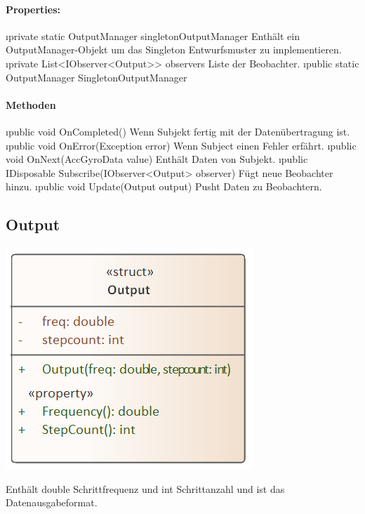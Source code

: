 \documentclass[../entwurf.tex]{subfiles}
\begin{document}
        \paragraph{Properties:}
        \begin{itemize}
            \i{private static OutputManager singletonOutputManager} Enthält ein OutputManager-Objekt um das Singleton Entwurfsmuster zu implementieren.
            \i{private List<IObserver<Output>> observers} Liste der Beobachter.
            \i{public static OutputManager SingletonOutputManager} 
        \end{itemize}
        \paragraph{Methoden}
        \begin{itemize}
            \i{public void OnCompleted()} Wenn Subjekt fertig mit der Datenübertragung ist.
            \i{public void OnError(Exception error)} Wenn Subject einen Fehler erfährt.
            \i{public void OnNext(AccGyroData value)} Enthält Daten von Subjekt.
            \i{public IDisposable Subscribe(IObserver<Output> observer)} Fügt neue Beobachter hinzu.
            \i{public void Update(Output output)} Pusht Daten zu Beobachtern.
        \end{itemize}
    

    \subsection{Output}
    	\begin{minipage}{0.55\textwidth}
    		  \includegraphics[scale=0.75]{../uml_klassen/StepDetectionLib/Output.png}
    	\end{minipage}
    	\begin{minipage}{0.45\textwidth}
    		Enthält double Schrittfrequenz und int Schrittanzahl und ist das Datenausgabeformat.
    	\end{minipage}
    	
\end{document}
